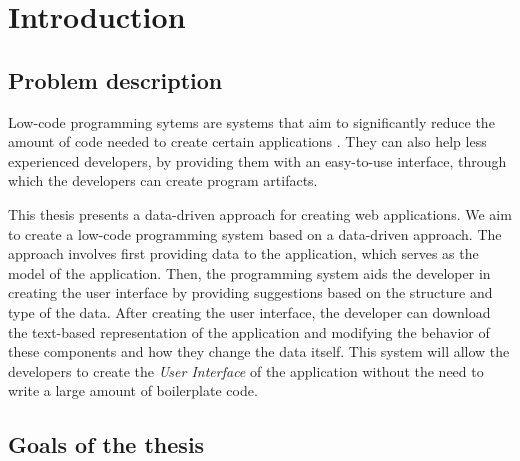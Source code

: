 \chapter*{Introduction}

\section*{Problem description}
Low-code programming sytems are systems that aim to significantly reduce the amount of code needed to create certain applications \cite{Pinho_Aguiar_Amaral_2023}.
They can also help less experienced developers, by providing them with an easy-to-use interface, through which the developers can create program artifacts.

This thesis presents a data-driven approach for creating web applications.
We aim to create a low-code programming system based on a data-driven approach.
The approach involves first providing data to the application, which serves as the model of the application.
Then, the programming system aids the developer in creating the user interface by providing suggestions based on the structure and type of the data.
After creating the user interface, the developer can download the text-based representation of the application and modifying the behavior of these components and how they change the data itself.
This system will allow the developers to create the \emph{User Interface} of the application without the need to write a large amount of boilerplate code.

\section*{Goals of the thesis}

